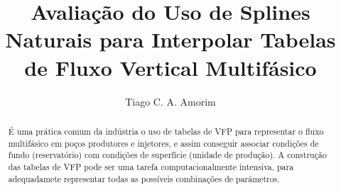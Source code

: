 \documentclass[final,5p]{elsarticle}
\numberwithin{equation}{section}
\begin{document}
\begin{frontmatter}



\title{Avaliação do Uso de Splines Naturais para Interpolar Tabelas de Fluxo Vertical Multifásico}


\author{Tiago C. A. Amorim}

\begin{abstract}

    É uma prática comum da indústria o uso de tabelas de VFP para representar o fluxo multifásico em poços produtores e injetores, e assim conseguir associar condições de fundo (reservatório) com condições de superfície (unidade de produção). A construção das tabelas de VFP pode ser uma tarefa computacionalmente intensiva, para adequadamete representar todas as possíveis combinações de parâmetros.


\end{abstract}
\end{frontmatter}
\end{document}
